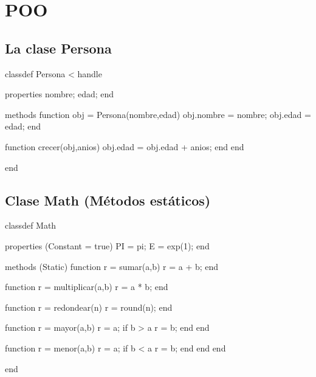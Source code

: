 \chapter{POO}

\section{La clase Persona}


\sol

\begin{matlab}
classdef Persona < handle
    
    properties
        nombre;
        edad;
    end
    
    methods
        function obj = Persona(nombre,edad)
            obj.nombre = nombre;
            obj.edad = edad;
        end
        
        function crecer(obj,anios)
            obj.edad = obj.edad + anios;
        end
    end
    
end
\end{matlab}


\section{Clase Math (Métodos estáticos)}


\sol

\begin{matlab}
classdef Math
    
    properties (Constant = true)
        PI = pi;
        E = exp(1);
    end
    
    methods (Static)
        function r = sumar(a,b)
            r = a + b;
        end
        
        function r = multiplicar(a,b)
            r = a * b;
        end
        
        function r = redondear(n)
            r = round(n);
        end
        
        function r = mayor(a,b)
            r = a;
            if b > a
                r = b;
            end
        end
        
        function r = menor(a,b)
            r = a;
            if b < a
                r = b;
            end
        end
    end
    
end  
\end{matlab}
